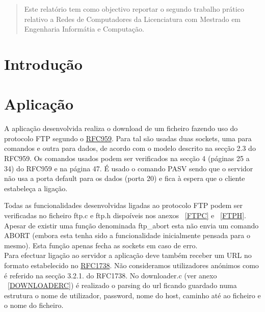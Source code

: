 \documentclass[11pt,a4paper,reqno]{report}
\numberwithin{equation}{section}
\begin{document}



\begin{abstract}
	
Este relatório tem como objectivo reportar o segundo trabalho prático relativo a Redes de Computadores da Licenciatura com Mestrado em Engenharia Informátia e Computação. 


\end{abstract}

\tableofcontents

\chapter{Introdução}


	
\chapter{Aplicação}

A aplicação desenvolvida realiza o download de um ficheiro fazendo uso do protocolo FTP segundo o  \href{https://www.ietf.org/rfc/rfc959.txt}{RFC959}.
Para tal são usadas duas sockets, uma para comandos e outra para dados, de acordo com o modelo descrito na secção 2.3 do RFC959.
Os comandos usados podem ser verificados na secção 4 (páginas 25 a 34) do RFC959 e na página 47. É usado o comando PASV sendo que o servidor não usa a porta default para os dados (porta 20) e fica à espera que o cliente estabeleça a ligação.

Todas as funcionalidades desenvolvidas ligadas ao protocolo FTP podem ser verificadas no ficheiro ftp.c e ftp.h dispoíveis nos anexos ~\ref{FTPC} e ~\ref{FTPH}. Apesar de existir uma função denominada ftp\_abort esta não envia um comando ABORT (embora esta tenha sido a funcionalidade inicialmente pensada para o mesmo). Esta função apenas fecha as sockets em caso de erro.\\

Para efectuar ligação ao servidor a aplicação deve também receber um URL no formato estabelecido no  \href{https://www.ietf.org/rfc/rfc1738.txt}{RFC1738}. Não consideramos utilizadores anónimos como é referido na secção 3.2.1. do RFC1738. No downloader.c (ver anexo ~\ref{DOWNLOADERC}) é realizado o parsing do url ficando guardado numa estrutura o nome de utilizador, password, nome do host, caminho até ao ficheiro e o nome do ficheiro.
\end{document}
